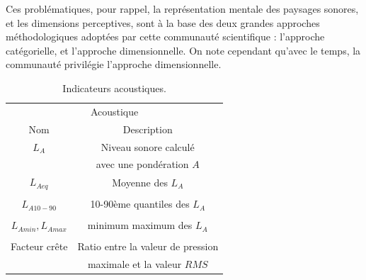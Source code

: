 Ces problématiques, pour rappel, la représentation mentale des paysages sonores, et les dimensions perceptives, sont à la base des deux grandes approches méthodologiques adoptées par cette communauté scientifique : l'approche catégorielle, et l'approche dimensionnelle. On note cependant qu'avec le temps, la communauté privilégie l'approche dimensionnelle. \\


\begin{table}[t]
\centering
\begin{tabular}{c c} 
\multicolumn{2}{c}{Acoustique} \\ 
Nom                           & Description            \\                                                            
\hline
$L_{A}$                                   & Niveau sonore calculé      \\
                                          & avec une pondération $A$\\
$L_{Aeq}$                                 & Moyenne des $L_A$     \\
                                          &         \\
$L_{A10-90}$                              & 10-90ème quantiles des $L_A$     \\
                                          &         \\
$L_{Amin}, L_{Amax}$                      & minimum maximum des $L_A$    \\
                                          &         \\
Facteur crête                             & Ratio entre la valeur de pression     \\
                                          & maximale et la valeur $RMS$        \\                                          
\hline
\end{tabular}
\vspace{0.5mm}
\caption{Indicateurs acoustiques.}
\label{tab:acousIndi}
\end{table}

